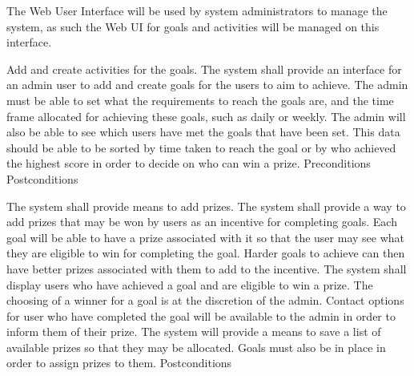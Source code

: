 The Web User Interface will be used by system administrators to manage the system, as such the Web UI for goals and activities will be managed on this interface.

\FunqReq
{Add and create activities for the goals.}
{The system shall provide an interface for an admin user to add and create goals for the users to aim to achieve. The admin must be able to set what the requirements to reach the goals are, and the time frame allocated for achieving these goals, such as daily or weekly. The admin will also be able to see which users have met the goals that have been set. This data should be able  to be sorted by time taken to reach the goal or by who achieved the highest score in order to decide on who can win a prize.}
{Preconditions}
{Postconditions}

\FuncReq
{The system shall provide means to add prizes.}
{The system shall provide a way to add prizes that may be won by users as an incentive for completing goals. Each goal will be able to have a prize associated with it so that the user may see what they are eligible to win for completing the goal. Harder goals to achieve can then have better prizes associated with them to add to the incentive. The system shall display users who have achieved a goal and are eligible to win a prize. The choosing of a winner for a goal is at the discretion of the admin. Contact options for user who have completed the goal will be available to the admin in order to inform them of their prize.}
{The system will provide a means to save a list of available prizes so that they may be allocated. Goals must also be in place in order to assign prizes to them.}
{Postconditions}
